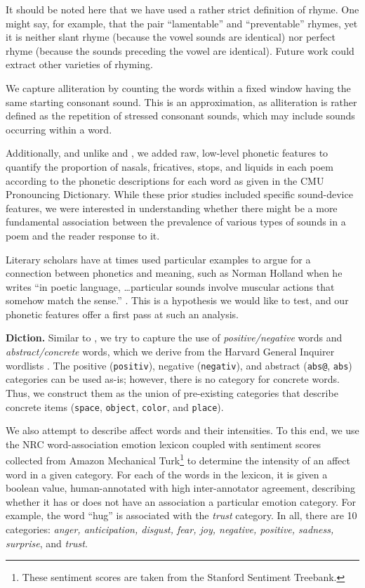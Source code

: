 \documentclass[11pt]{article}
\newcommand{\slimparagraph}[1]{
\vspace{4pt} %
\textbf{#1.}\quad}
\begin{document}
It should be noted here that we have used a rather strict definition of rhyme. One might say, for example, that the pair ``lamentable'' and ``preventable'' rhymes, yet it is neither slant rhyme (because the vowel sounds are identical) nor perfect rhyme (because the sounds preceding the vowel are identical). Future work could extract other varieties of rhyming.

We capture alliteration by counting the words within a fixed window having the same starting consonant sound. This is an approximation, as alliteration is rather defined as the repetition of stressed consonant sounds, which may include sounds occurring within a word.

Additionally, and unlike  and , we added raw, low-level phonetic features to quantify the proportion of nasals, fricatives, stops, and liquids in each poem according to the phonetic descriptions for each word as given in the CMU Pronouncing Dictionary. While these prior studies included specific sound-device features, we were interested in understanding whether there might be a more fundamental association between the prevalence of various types of sounds in a poem and the reader response to it. 

Literary scholars have at times used particular examples to argue for a connection between phonetics and meaning, such as Norman Holland when he writes ``in poetic language, \dots particular sounds involve muscular actions that somehow match the sense.'' \cite{holland1989dynamics}. This is a hypothesis we would like to test, and our phonetic features offer a first pass at such an analysis.


\slimparagraph{Diction}
Similar to , we try to capture the use of \emph{positive/negative} words and \emph{abstract/concrete} words, which we derive from the Harvard General Inquirer wordlists \cite{stone1962general}. The positive (\texttt{positiv}), negative (\texttt{negativ}), and abstract (\texttt{abs@}, \texttt{abs}) categories can be used as-is; however, there is no category for concrete words. Thus, we construct them as the union of pre-existing categories that describe concrete items (\texttt{space}, \texttt{object}, \texttt{color}, and \texttt{place}).

We also attempt to describe affect words and their intensities. To this end, we use the NRC word-association emotion lexicon \cite{mohammad2010emotions} coupled with sentiment scores collected from Amazon Mechanical Turk\footnote{These sentiment scores are taken from the Stanford Sentiment Treebank.} to determine the intensity of an affect word in a given category. For each of the words in the lexicon, it is given a boolean value, human-annotated with high inter-annotator agreement, describing whether it has or does not have an association a particular emotion category. For example, the word ``hug'' is associated with the \emph{trust} category. In all, there are 10 categories: \emph{anger, anticipation, disgust, fear, joy, negative, positive, sadness, surprise}, and \emph{trust}.
\end{document}
